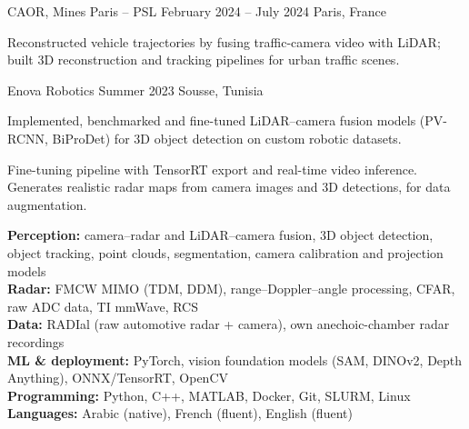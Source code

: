 %
        {CAOR, Mines Paris -- PSL}%
        {February 2024 -- July 2024}%
        {Paris, France}
\begin{cvitems}
  \item Reconstructed vehicle trajectories by fusing traffic-camera video with LiDAR; built
        3D reconstruction and tracking pipelines for urban traffic scenes.
\end{cvitems}

%
        {Enova Robotics}%
        {Summer 2023}%
        {Sousse, Tunisia}
\begin{cvitems}
  \item Implemented, benchmarked and fine-tuned LiDAR--camera fusion models (PV-RCNN, BiProDet)
        for 3D object detection on custom robotic datasets.
\end{cvitems}


%
  {Fine-tuning pipeline with TensorRT export and real-time video inference.}
%
  {Generates realistic radar maps from camera images and 3D detections, for data augmentation.}


\noindent
\textbf{Perception:} camera--radar and LiDAR--camera fusion, 3D object detection, object
  tracking, point clouds, segmentation, camera calibration and projection models\\
\textbf{Radar:} FMCW MIMO (TDM, DDM), range--Doppler--angle processing, CFAR, raw ADC data,
  TI mmWave, RCS\\
\textbf{Data:} RADIal (raw automotive radar + camera), own anechoic-chamber radar recordings\\
\textbf{ML \& deployment:} PyTorch, vision foundation models (SAM, DINOv2, Depth Anything),
  ONNX/TensorRT, OpenCV\\
\textbf{Programming:} Python, C++, MATLAB, Docker, Git, SLURM, Linux\\
\textbf{Languages:} Arabic (native), French (fluent), English (fluent)

\PublicationsBlock
\EducationBlock


